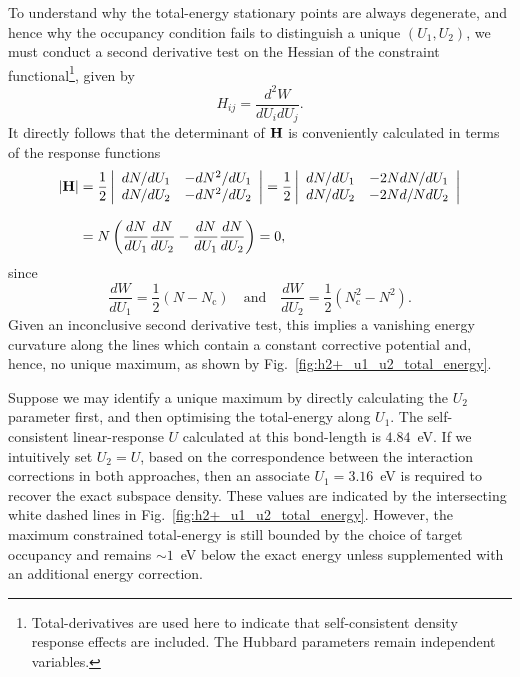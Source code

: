 To understand why the total-energy 
stationary points are always degenerate, 
and hence why the occupancy condition 
fails to distinguish a unique 
$\left( U_1,U_2 \right)$,
we must conduct a second derivative test 
on the Hessian of the constraint 
functional\footnote{Total-derivatives are used here
to indicate that self-consistent
density response effects are included. 
The Hubbard parameters
remain independent variables.}, 
given by
%
\begin{equation}
H_{ij}=\frac{d^2 W}{d U_i d U_j}.
\end{equation}
%
It directly follows that the determinant of ${\bf H}$ is
conveniently calculated
in terms of the response functions
%
\begin{align}
|{\bf H}| 
&=\frac{1}{2}\left|\begin{array}{cc}
	dN/dU_1 & -dN^2/dU_1 \\
	dN/dU_2 & -dN^2/dU_2 \\
	\end{array}\right| 
=\frac{1}{2}\left|\begin{array}{cc}
	dN/dU_1 & -2NdN/dU_1 \\
	dN/dU_2 & -2Nd/NdU_2 \\
	\end{array}\right| \nonumber \\[0.75em]
&=N\left(\frac{dN}{dU_1}\frac{dN}{dU_2}-\frac{dN}{dU_1}\frac{dN}{dU_2}\right)=0,
\end{align}
%
since 
%
\begin{equation}
\frac{dW}{dU_1}=\frac{1}{2}(N-N_\textrm{c})
\quad\mbox{and}\quad
\frac{dW}{dU_2}=\frac{1}{2}(N_\textrm{c}^2-N^2).
\end{equation}
%
Given an inconclusive second derivative test, 
this implies a vanishing energy curvature 
along the lines which contain 
a constant corrective potential and, 
hence, no unique maximum, 
as shown by Fig.~\ref{fig:h2+_u1_u2_total_energy}.

Suppose we may identify a unique maximum by  
directly calculating the $U_2$ parameter first, 
and then optimising the total-energy along $U_1$.
%
The self-consistent linear-response $U$ 
calculated at this bond-length is $4.84$~eV. 
%
If we intuitively set $U_2 = U$, 
based on the correspondence between 
the interaction corrections in both approaches, 
then an associate $U_1 = 3.16$~eV 
is required to recover the exact subspace density.
%
These values are indicated by the intersecting 
white dashed lines in Fig.~\ref{fig:h2+_u1_u2_total_energy}.
%
However, the maximum constrained total-energy 
is still bounded by the choice of target occupancy
and remains $\sim 1$~eV below the exact energy 
unless supplemented with an additional energy correction.

